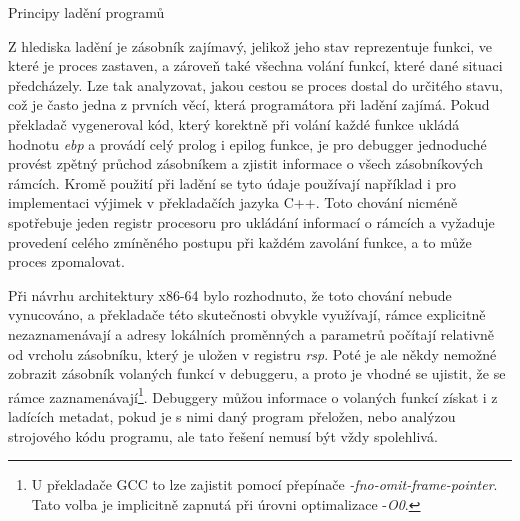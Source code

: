 \documentclass[czech,bachelor,male,python,dept460]{diploma}						%
\newcommand{\parspace}[1][]{
	\ifthenelse{\isempty{#1}}{\vspace{5mm}}{\vspace{#1}}
	\par
}
\begin{document}
\begin{section}{Principy ladění programů}
		\parspace Z hlediska ladění je zásobník zajímavý, jelikož jeho stav reprezentuje funkci, ve které je proces zastaven, a zároveň také všechna volání
		funkcí, které dané situaci předcházely. Lze tak analyzovat, jakou cestou se proces dostal do určitého stavu, což je často jedna z prvních věcí, která
		programátora při ladění zajímá. Pokud překladač vygeneroval kód, který korektně při volání každé funkce ukládá hodnotu \textit{ebp} a provádí
		celý prolog i epilog funkce, je pro debugger jednoduché provést zpětný průchod zásobníkem a zjistit informace o všech zásobníkových rámcích.
		Kromě použití při ladění se tyto údaje používají například i pro implementaci výjimek v překladačích jazyka C++.
		Toto chování nicméně spotřebuje jeden registr procesoru pro ukládání informací o rámcích a vyžaduje provedení celého zmíněného postupu při každém
		zavolání funkce, a to může proces zpomalovat.
		
		\parspace Při návrhu architektury x86-64 bylo rozhodnuto, že toto chování nebude vynucováno\cite[16]{x64abi}, a překladače této skutečnosti
		obvykle využívají, rámce explicitně nezaznamenávají a adresy lokálních proměnných a parametrů počítají relativně od vrcholu zásobníku,
		který je uložen v registru \textit{rsp}. Poté je ale někdy nemožné zobrazit zásobník volaných funkcí v debuggeru, a proto je vhodné se ujistit,
		že se rámce zaznamenávají\footnote{U překladače GCC to lze zajistit pomocí přepínače \textit{-fno-omit-frame-pointer}.
		Tato volba je implicitně zapnutá při úrovni optimalizace -\textit{O0}. }.
		Debuggery můžou informace o volaných funkcí získat i z ladících metadat, pokud je s nimi daný program přeložen,
		nebo analýzou strojového kódu programu, ale tato řešení nemusí být vždy spolehlivá.
\end{section}
\end{document}
